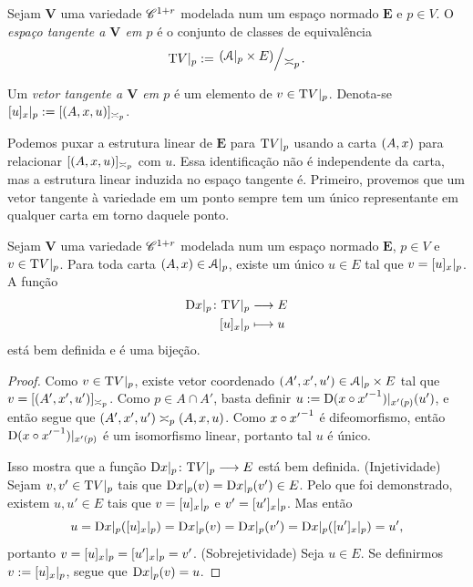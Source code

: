 \begin{definition}
Sejam $\bm V$ uma variedade $\mathscr{C}^{1+r}$ modelada num um espaço normado $\bm E$ e $p \in V$. O \emph{espaço tangente a $\bm V$ em $p$} é o conjunto de classes de equivalência
	\begin{equation*}
	\Tg V|_p := \quo{(\atlas|_p \times E)}{\asymp_p}.
	\end{equation*}

Um \emph{vetor tangente a $\bm V$ em $p$} é um elemento de $v \in \mathrm{T} V|_p$. Denota-se $[u]_{x}|_p := [(A,x,u)]_{\asymp_p}$.
\end{definition}

Podemos puxar a estrutura linear de $\bm E$ para $\mathrm{T} V|_p$ usando a carta $(A,x)$ para relacionar $[(A,x,u)]_{\asymp_p}$ com $u$. Essa identificação não é independente da carta, mas a estrutura linear induzida no espaço tangente é. Primeiro, provemos que um vetor tangente à variedade em um ponto sempre tem um único representante em qualquer carta em torno daquele ponto.

\begin{proposition}
Sejam $\bm V$ uma variedade $\mathscr{C}^{1+r}$ modelada num um espaço normado $\bm E$, $p \in V$ e $v \in \mathrm{T} V|_p$. Para toda carta $(A,x) \in \mathcal{A}|_p$, existe um único $u \in E$ tal que $v = [u]_{x}|_p$. A função
	\begin{align*}
	{\mathrm{D}x|_p}\colon {\mathrm{T}V|_p} &\longrightarrow {E} \\{[u]_{x}|_p} &\longmapsto u
	\end{align*}
está bem definida e é uma bijeção.
\end{proposition}
\begin{proof}
Como $v \in \mathrm{T} V|_p$, existe vetor coordenado $(A',x',u') \in \mathcal{A}|_p \times E$ tal que $v = [(A',x',u')]_{\asymp_p}$. Como $p \in A \cap A'$, basta definir $u := \mathrm{D}(x \circ {x'}^{-1})|_{x'(p)}(u')$, e então segue que $(A',x',u') \asymp_p (A,x,u)$. Como $x \circ {x'}^{-1}$ é difeomorfismo, então $\mathrm{D}(x \circ {x'}^{-1})|_{x'(p)}$ é um isomorfismo linear, portanto tal $u$ é único.

Isso mostra que a função $\mathrm{D}x|_p\colon \allowbreak \mathrm{T} V|_p \longrightarrow E$ está bem definida. (Injetividade) Sejam $v,v' \in \mathrm{T} V|_p$ tais que $\mathrm{D} x|_p(v) = \mathrm{D} x|_p(v') \in E$. Pelo que foi demonstrado, existem $u, u' \in E$ tais que $v = [u]_{x}|_p$ e $v' = [u']_{x}|_p$. Mas então
	\begin{equation*}
	u = \mathrm{D} x|_p([u]_{x}|_p) = \mathrm{D} x|_p(v) = \mathrm{D} x|_p(v') = \mathrm{D} x|_p([u']_{x}|_p) = u',
	\end{equation*}
portanto $v = [u]_{x}|_p = [u']_{x}|_p = v'$. (Sobrejetividade) Seja $u \in E$. Se definirmos $v := [u]_{x}|_p$, segue que $\mathrm{D} x|_{p}(v) = u$.



\end{proof}


